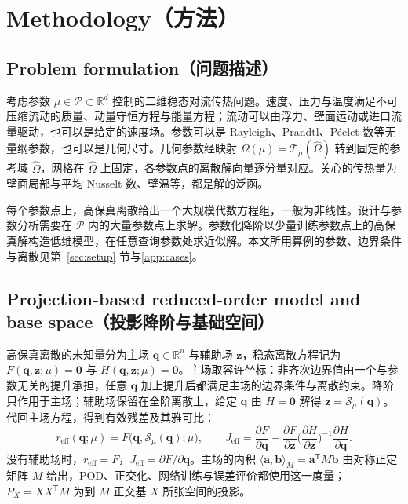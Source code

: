\section{Methodology（方法）}
\label{sec:method}

\subsection{Problem formulation（问题描述）}
\label{sec:problem}

考虑参数 $\mu\in\mathcal P\subset\mathbb R^d$ 控制的二维稳态对流传热问题。速度、压力与温度满足不可压缩流动的质量、动量守恒方程与能量方程；流动可以由浮力、壁面运动或进口流量驱动，也可以是给定的速度场。参数可以是 Rayleigh、Prandtl、P\'eclet 数等无量纲参数，也可以是几何尺寸。几何参数经映射 $\Omega(\mu)=\mathcal T_\mu(\hat\Omega)$ 转到固定的参考域 $\hat\Omega$，网格在 $\hat\Omega$ 上固定，各参数点的离散解向量逐分量对应。关心的传热量为壁面局部与平均 Nusselt 数、壁温等，都是解的泛函。

每个参数点上，高保真离散给出一个大规模代数方程组，一般为非线性。设计与参数分析需要在 $\mathcal P$ 内的大量参数点上求解。参数化降阶以少量训练参数点上的高保真解构造低维模型，在任意查询参数处求近似解。本文所用算例的参数、边界条件与离散见第~\ref{sec:setup} 节与\ref{app:cases}。

\subsection{Projection-based reduced-order model and base space（投影降阶与基础空间）}
\label{sec:base}

高保真离散的未知量分为主场 $\mathbf q\in\mathbb R^n$ 与辅助场 $\mathbf z$，稳态离散方程记为 $F(\mathbf q,\mathbf z;\mu)=\mathbf 0$ 与 $H(\mathbf q,\mathbf z;\mu)=\mathbf 0$。主场取容许坐标：非齐次边界值由一个与参数无关的提升承担，任意 $\mathbf q$ 加上提升后都满足主场的边界条件与离散约束。降阶只作用于主场；辅助场保留在全阶离散上，给定 $\mathbf q$ 由 $H=\mathbf 0$ 解得 $\mathbf z=\mathcal S_\mu(\mathbf q)$。代回主场方程，得到有效残差及其雅可比：
\begin{equation}
r_{\mathrm{eff}}(\mathbf q;\mu)=F\big(\mathbf q,\mathcal S_\mu(\mathbf q);\mu\big),\qquad
J_{\mathrm{eff}}=\frac{\partial F}{\partial\mathbf q}-\frac{\partial F}{\partial\mathbf z}\Big(\frac{\partial H}{\partial\mathbf z}\Big)^{-1}\frac{\partial H}{\partial\mathbf q}.
\label{eq:reff}
\end{equation}
没有辅助场时，$r_{\mathrm{eff}}=F$，$J_{\mathrm{eff}}=\partial F/\partial\mathbf q$。主场的内积 $\langle\mathbf a,\mathbf b\rangle_M=\mathbf a^{\mathsf T}M\mathbf b$ 由对称正定矩阵 $M$ 给出，POD、正交化、网络训练与误差评价都使用这一度量；$P_X=XX^{\mathsf T}M$ 为到 $M$ 正交基 $X$ 所张空间的投影。

